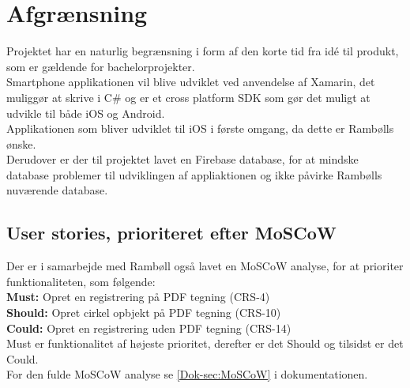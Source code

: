 \section{Afgrænsning}
Projektet har en naturlig begrænsning i form af den korte tid fra idé til produkt, som er gældende for bachelorprojekter.\\
Smartphone applikationen vil blive udviklet ved anvendelse af Xamarin, det muliggør at skrive i C\# og er et cross platform SDK som gør det muligt at udvikle til både iOS og Android. \\
Applikationen som bliver udviklet til iOS i første omgang, da dette er Rambølls ønske. \\
Derudover er der til projektet lavet en Firebase database, for at mindske database problemer til udviklingen af appliaktionen og ikke påvirke Rambølls nuværende database.

\subsection{User stories, prioriteret efter MoSCoW}
Der er i samarbejde med Rambøll også lavet en MoSCoW \cite{MoSCoW} analyse, for at prioriter funktionaliteten, som følgende: \\
\textbf{Must:} Opret en registrering på PDF tegning (CRS-4) \\
\textbf{Should:} Opret cirkel opbjekt på PDF tegning (CRS-10) \\
\textbf{Could:} Opret en registrering uden PDF tegning (CRS-14) \\
Must er funktionalitet af højeste prioritet, derefter er det Should og tilsidst er det Could. \\
For den fulde MoSCoW analyse se \vref{Dok-sec:MoSCoW} i dokumentationen. 
	